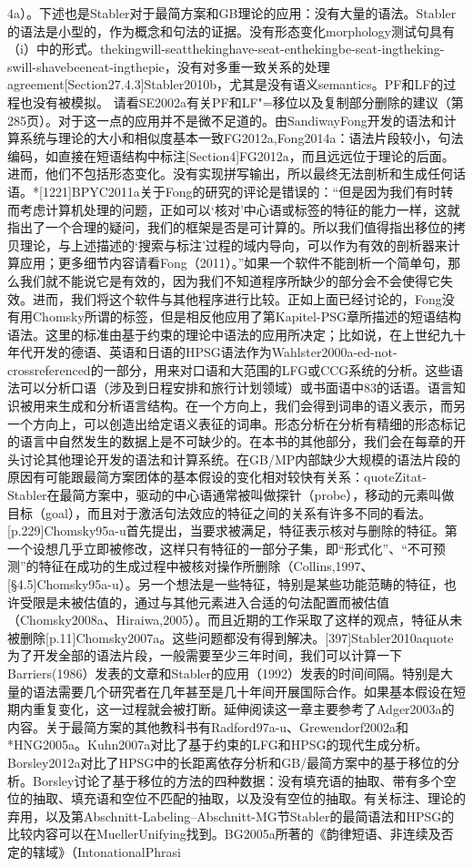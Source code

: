 4a）。下述也是Stabler对于最简方案和GB理论的应用：没有大量的语法。Stabler的语法是小型的，作为概念和句法的证据。没有形态变化morphology测试句具有（i）中的形式。thekingwill-seatthekinghave-seat-enthekingbe-seat-ingtheking-swill-shavebeeneat-ingthepie，没有对多重一致关系的处理agreement[Section27.4.3]Stabler2010b，尤其是没有语义semantics。PF和LF的过程也没有被模拟。	请看SE2002a有关PF和LF"=移位以及复制部分删除的建议（第285页）。对于这一点的应用并不是微不足道的。由SandiwayFong开发的语法和计算系统与理论的大小和相似度基本一致FG2012a,Fong2014a：语法片段较小，句法编码，如直接在短语结构中标注[Section4]FG2012a，而且远远位于理论的后面。进而，他们不包括形态变化。没有实现拼写输出，所以最终无法剖析和生成任何话语。*[1221]BPYC2011a关于Fong的研究的评论是错误的：“但是因为我们有时转而考虑计算机处理的问题，正如可以‘核对’中心语或标签的特征的能力一样，这就指出了一个合理的疑问，我们的框架是否是可计算的。所以我们值得指出移位的拷贝理论，与上述描述的‘搜索与标注’过程的域内导向，可以作为有效的剖析器来计算应用；更多细节内容请看Fong（2011）。”如果一个软件不能剖析一个简单句，那么我们就不能说它是有效的，因为我们不知道程序所缺少的部分会不会使得它失效。进而，我们将这个软件与其他程序进行比较。正如上面已经讨论的，Fong没有用Chomsky所谓的标签，但是相反他应用了第Kapitel-PSG章所描述的短语结构语法。这里的标准由基于约束的理论中语法的应用所决定；比如说，在上世纪九十年代开发的德语、英语和日语的HPSG语法作为Wahlster2000a-ed-not-crossreferenced的一部分，用来对口语和大范围的LFG或CCG系统的分析。这些语法可以分析口语（涉及到日程安排和旅行计划领域）或书面语中83的话语。语言知识被用来生成和分析语言结构。在一个方向上，我们会得到词串的语义表示，而另一个方向上，可以创造出给定语义表征的词串。形态分析在分析有精细的形态标记的语言中自然发生的数据上是不可缺少的。在本书的其他部分，我们会在每章的开头讨论其他理论开发的语法和计算系统。在GB/MP内部缺少大规模的语法片段的原因有可能跟最简方案团体的基本假设的变化相对较快有关系：quoteZitat-Stabler在最简方案中，驱动的中心语通常被叫做探针（probe），移动的元素叫做目标（goal），而且对于激活句法效应的特征之间的关系有许多不同的看法。[p.229]Chomsky95a-u首先提出，当要求被满足，特征表示核对与删除的特征。第一个设想几乎立即被修改，这样只有特征的一部分子集，即“形式化”、“不可预测”的特征在成功的生成过程中被核对操作所删除（Collins,1997、[§4.5]Chomsky95a-u）。另一个想法是一些特征，特别是某些功能范畴的特征，也许受限是未被估值的，通过与其他元素进入合适的句法配置而被估值（Chomsky2008a、Hiraiwa,2005）。而且近期的工作采取了这样的观点，特征从未被删除[p.11]Chomsky2007a。这些问题都没有得到解决。[397]Stabler2010aquote为了开发全部的语法片段，一般需要至少三年时间，我们可以计算一下Barriers(1986）发表的文章和Stabler的应用（1992）发表的时间间隔。特别是大量的语法需要几个研究者在几年甚至是几十年间开展国际合作。如果基本假设在短期内重复变化，这一过程就会被打断。延伸阅读这一章主要参考了Adger2003a的内容。关于最简方案的其他教科书有Radford97a-u、Grewendorf2002a和*HNG2005a。Kuhn2007a对比了基于约束的LFG和HPSG的现代生成分析。Borsley2012a对比了HPSG中的长距离依存分析和GB/最简方案中的基于移位的分析。Borsley讨论了基于移位的方法的四种数据：没有填充语的抽取、带有多个空位的抽取、填充语和空位不匹配的抽取，以及没有空位的抽取。有关标注、理论的弃用，以及第Abschnitt-Labeling--Abschnitt-MG节Stabler的最简语法和HPSG的比较内容可以在MuellerUnifying找到。BG2005a所著的《韵律短语、非连续及否定的辖域》（IntonationalPhrasi